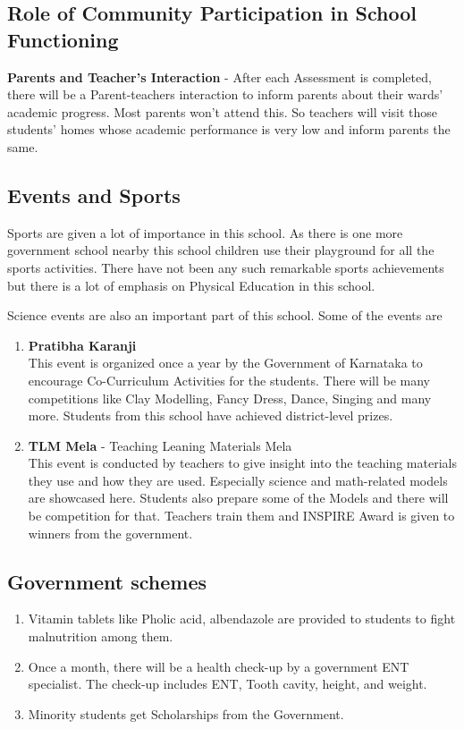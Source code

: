 \subsection{Role of Community Participation in School Functioning}
\textbf{Parents and Teacher’s Interaction} -  After each Assessment is completed, there will be a Parent-teachers interaction to inform parents about their wards' academic progress. Most parents won’t attend this. So teachers will visit those students' homes whose academic performance is very low and inform parents the same.
\subsection{Events and Sports}
Sports are given a lot of importance in this school. As there is one more government school nearby this school children use their playground for all the sports activities. There have not been any such remarkable sports achievements but there is a lot of emphasis on Physical Education in this school. 

Science events are also an important part of this school. Some of the events are 
\begin{enumerate}
    \item \textbf{Pratibha Karanji} \\
    This event is organized once a year by the Government of Karnataka to encourage Co-Curriculum Activities for the students. There will be many competitions like Clay Modelling, Fancy Dress, Dance, Singing and many more. Students from this school have achieved district-level prizes.
    \item \textbf{TLM Mela} - Teaching Leaning Materials Mela \\
    This event is conducted by teachers to give insight into the teaching materials they use and how they are used. Especially science and math-related models are showcased here. Students also prepare some of the Models and there will be competition for that. Teachers train them and INSPIRE Award is given to winners from the government.  
\end{enumerate}

\subsection{Government schemes}
\begin{enumerate}
    \item Vitamin tablets like Pholic acid, albendazole are provided to students to fight malnutrition among them.
    \item Once a month, there will be a health check-up by a government ENT specialist. The check-up includes ENT, Tooth cavity, height, and weight. 
    \item  Minority students get Scholarships from the Government. 
\end{enumerate}
